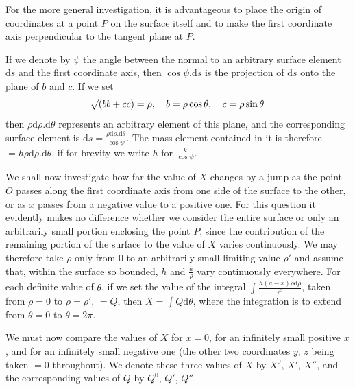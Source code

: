 For the more general investigation, it is advantageous to place the origin of coordinates at a point $P$ on the surface itself and to make the first coordinate axis perpendicular to the tangent plane at $P$.
%

If we denote by $\psi$ the angle between the normal to an arbitrary surface element $\mathrm{d}s$ and the first coordinate axis, then $\cos\psi.\mathrm{d}s$ is the projection of $\mathrm{d}s$ onto the plane of $b$ and $c$. If we set
\[
\mathord{{}^{}\!\surd}(bb+cc)=\rho,\quad b=\rho\cos\theta,\quad c=\rho\sin\theta
\]
then $\rho\mathrm{d}\rho.\mathrm{d}\theta$ represents an arbitrary element of this plane, and the corresponding surface element is $\mathrm{d}s=\frac{\rho\mathrm{d}\rho.\mathrm{d}\theta}{\cos\psi}$. The mass element contained in it is therefore $=h\rho\mathrm{d}\rho.\mathrm{d}\theta$, if for brevity we write $h$ for $\frac{k}{\cos\psi}$.

We shall now investigate how far the value of $X$ changes by a jump as the point $O$ passes along the first coordinate axis from one side of the surface to the other, or as $x$ passes from a negative value to a positive one. For this question it evidently makes no difference whether we consider the entire surface or only an arbitrarily small portion enclosing the point $P$, since the contribution of the remaining portion of the surface to the value of $X$ varies continuously. We may therefore take $\rho$ only from $0$ to an arbitrarily small limiting value $\rho'$ and assume that, within the surface so bounded, $h$ and $\frac{a}{\rho}$ vary continuously everywhere. For each definite value of $\theta$, if we set the value of the integral $\int\frac{h(a-x)\rho\mathrm{d}\rho}{r^3}$, taken from $\rho=0$ to $\rho=\rho'$, $=Q$, then $X=\int Q\mathrm{d}\theta$, where the integration is to extend from $\theta=0$ to $\theta=2\pi$.

We must now compare the values of $X$ for $x=0$, for an infinitely small positive $x$, and for an infinitely small negative one (the other two coordinates $y$, $z$ being taken $=0$ throughout). We denote these three values of $X$ by $X^0$, $X'$, $X''$, and the corresponding values of $Q$ by $Q^0$, $Q'$, $Q''$.

